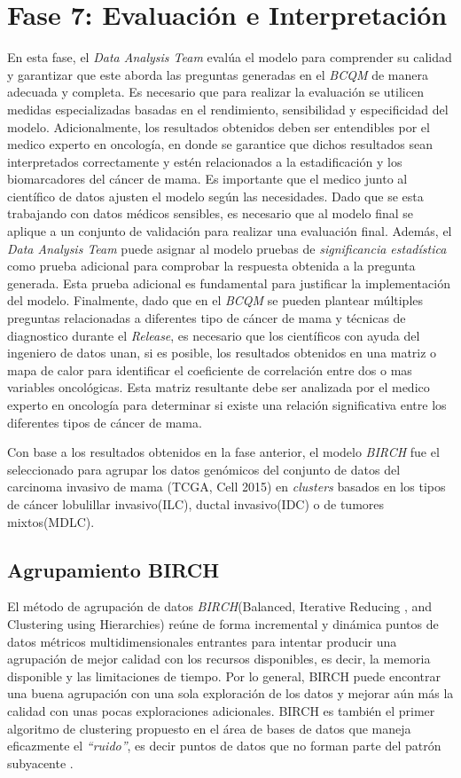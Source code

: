 \section{Fase 7: Evaluación e Interpretación}
En esta fase, el \textit{Data Analysis Team} evalúa el modelo para comprender su calidad y garantizar que este aborda las preguntas generadas en el \textit{BCQM} de manera adecuada y completa. Es necesario que para realizar la evaluación se utilicen medidas especializadas basadas en el rendimiento, sensibilidad y especificidad del modelo. Adicionalmente, los resultados obtenidos deben ser entendibles por el medico experto en oncología, en donde se garantice que dichos resultados sean interpretados correctamente y estén relacionados a la estadificación y los biomarcadores del cáncer de mama. Es importante que el medico junto al científico de datos ajusten el modelo según las necesidades. Dado que se esta trabajando con datos médicos sensibles, es necesario que al modelo final se aplique a un conjunto de validación para realizar una evaluación final. Además, el \textit{Data Analysis Team} puede asignar al modelo pruebas de \textit{significancia estadística} como prueba adicional para comprobar la respuesta obtenida a la pregunta generada. Esta prueba adicional es fundamental para justificar la implementación del modelo. Finalmente, dado que en el \textit{BCQM} se pueden plantear múltiples preguntas relacionadas a diferentes tipo de cáncer de mama y técnicas de diagnostico durante el \textit{Release}, es necesario que los científicos con ayuda del ingeniero de datos unan, si es posible, los resultados obtenidos en una matriz o mapa de calor para identificar el coeficiente de correlación entre dos o mas variables oncológicas. Esta matriz resultante debe ser analizada por el medico experto en oncología para determinar si existe una relación significativa entre los diferentes tipos de cáncer de mama.

Con base a los resultados obtenidos en la fase anterior, el modelo \textit{BIRCH} fue el seleccionado para agrupar los datos genómicos del conjunto de datos del carcinoma invasivo de mama (TCGA, Cell 2015) en \textit{clusters} basados en los tipos de cáncer lobulillar invasivo(ILC), ductal invasivo(IDC) o de tumores mixtos(MDLC).

\subsection{Agrupamiento BIRCH}
El  método de agrupación de datos \textit{BIRCH}(Balanced, Iterative Reducing , and Clustering using Hierarchies) reúne de forma incremental y dinámica puntos de datos métricos multidimensionales entrantes para intentar producir una agrupación de mejor calidad con los recursos disponibles, es decir, la memoria disponible y las limitaciones de tiempo. Por lo general, BIRCH puede encontrar una buena agrupación con una sola exploración de los datos y mejorar aún más la calidad con unas pocas exploraciones adicionales. BIRCH es también el primer algoritmo de clustering propuesto en el área de bases de datos que maneja eficazmente el \textit{“ruido”}, es decir puntos de datos que no forman parte del patrón subyacente \cite{Zhang1996}. 

